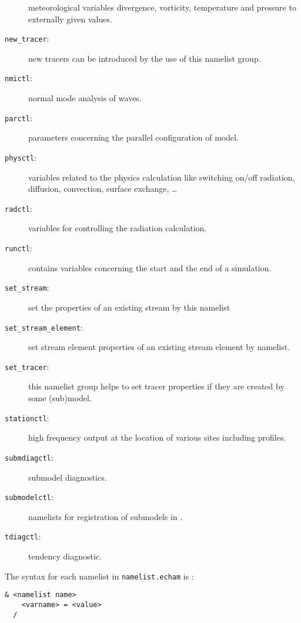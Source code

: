\begin{description}
    meteorological variables divergence, 
    vorticity, temperature and pressure to externally given values.
  \item[{\tt new\_tracer}:] new tracers
    can be introduced by the use of 
    this namelist group.
  \item[{\tt nmictl}:] normal mode analysis of waves.
  \item[{\tt parctl}:] parameters concerning
    the parallel 
    configuration of model. 
  \item[{\tt physctl}:] variables related to
    the physics calculation 
    like switching on/off radiation, diffusion,
  convection, surface exchange, \dots
  \item[{\tt radctl}:] variables for
    controlling the radiation calculation. 
  \item[{\tt runctl}:] contains variables
    concerning the start and the end 
  of a simulation.
  \item[{\tt set\_stream}:] set the
    properties of an existing stream 
    by this namelist
  \item[{\tt set\_stream\_element}:]
    set stream element
    properties of 
    an existing stream element by namelist.
  \item[{\tt set\_tracer}:] this namelist
    group helps to set tracer 
    properties if they are created by some (sub)model.
  \item[{\tt stationctl}:] high frequency
    output at the location of 
    various sites including profiles.
  \item[{\tt submdiagctl}:] submodel diagnostics.
  \item[{\tt submodelctl}:] namelists for
    registration of submodels in 
    \echam.
  \item[{\tt tdiagctl}:] tendency diagnostic.
\end{description}

The syntax for each namelist in {\tt namelist.echam} is
:
\begin{lstlisting}[caption= namelist syntax]
  & <namelist name>
    <varname> = <value>
  /
\end{lstlisting}

